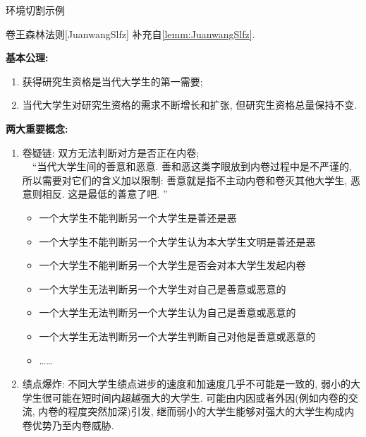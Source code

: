 \documentclass[hyperref, UTF8, CJK, aspectratio=169]{beamer}
\begin{document}
\begin{frame}[t,allowframebreaks]{环境切割示例}
	\begin{univremark}{卷王森林法则}[JuanwangSlfz]
		补充自\vref{lemm:JuanwangSlfz}.\par
		\textbf{\color{univred}基本公理:}
		\begin{enumerate}
			\item 获得研究生资格是当代大学生的第一需要;
			\item 当代大学生对研究生资格的需求不断增长和扩张, 但研究生资格总量保持不变.
		\end{enumerate}
		\textbf{\color{univred}两大重要概念:}
		\begin{enumerate}
			\item 卷疑链: 双方无法判断对方是否正在内卷;\\
			~~“当代大学生间的善意和恶意. 善和恶这类字眼放到内卷过程中是不严谨的, 所以需要对它们的含义加以限制: 善意就是指不主动内卷和卷灭其他大学生, 恶意则相反. 这是最低的善意了吧. ”
			\begin{itemize}
				\item 一个大学生不能判断另一个大学生是善还是恶
				\item 一个大学生不能判断另一个大学生认为本大学生文明是善还是恶
				\item 一个大学生不能判断另一个大学生是否会对本大学生发起内卷
				\item 一个大学生无法判断另一个大学生对自己是善意或恶意的
				\item 一个大学生无法判断另一个大学生认为自己是善意或恶意的
				\item 一个大学生无法判断另一个大学生判断自己对他是善意或恶意的
				\item \dots\dots
			\end{itemize}	
			\item 绩点爆炸: 不同大学生绩点进步的速度和加速度几乎不可能是一致的, 弱小的大学生很可能在短时间内超越强大的大学生. 可能由内因或者外因(例如内卷的交流, 内卷的程度突然加深)引发, 继而弱小的大学生能够对强大的大学生构成内卷优势乃至内卷威胁.
		\end{enumerate}
	\end{univremark}
\end{frame}
\end{document}
